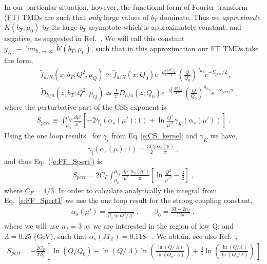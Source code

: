 \documentclass[final,3p,times,onecolumn,sort&compress,hidelinks]{elsarticle}
\newcommand\3[1]{\boldsymbol{#1}}
\begin{document}
In our particular situation, however, the functional form of Fourier transform (FT) TMDs    are such that {\em only} large values of $b_T$  dominate.  
Thus we {\em approximate} $K(b_T,\mu_0)$ by its large $b_T$ asymptote which is approximately  constant, and  negative,
  as suggested in Ref.~\cite{Collins:2014jpa}.
  We will call this constant $g_{K_{0}}\equiv \lim_{b_T\to \infty} \tilde K(b_T,\mu_0)$, such that in this approximation our FT TMDs take the form,
\begin{eqnarray}
&&\tilde f_{a/N} (x,b_T; Q^2, \mu_Q)\simeq \tilde f_{a/N} (x; Q_0) e^{-b_T^2 \frac{\langle k_\perp^2 \rangle_a}{4}}\,\left( \frac{Q}{Q_0}\right)^{g_{K_0}} e^{-S_{pert}/2}\,,
\nonumber \\[0.3cm]
&&\tilde D_{h/a}(z,b_T; Q^2, \mu_Q)\simeq \frac{1}{z^2} D_{h/a}(z; Q_0) e^{-b_T^2 \frac{\langle p_\perp^2 \rangle_a}{4 z^2}}\,\left( \frac{Q}{Q_0}\right)^{g_{K_0}}e^{-S_{pert}/2}\,,
\label{e:FF_ansatz1}
\end{eqnarray}
where the  perturbative part of the CSS exponent is
\begin{eqnarray}
S_{pert} \equiv \int_{\mu_0}^{\mu_Q} \frac{d \mu'}{\mu'}\left[
-2 \gamma_i(\alpha_s(\mu');1) +\ln\frac{Q^2}{\mu'^2}\gamma_K(\alpha_s(\mu'))
 \right] \; .
 \label{e:FF_Spert}
\end{eqnarray}
 Using the  one loop results~\cite{Aybat:2011zv} for $\gamma_i$ from Eq~\eqref{e:CS_kernel} and $\gamma_K$  we have,
\begin{eqnarray}
  \gamma_i(\alpha_s(\mu);1) = \frac{3 C_F}{2}  \frac{\alpha_s(\mu)}{\pi}  \ ,
  \end{eqnarray}
and thus Eq.~(\ref{e:FF_Spert}) is
\begin{eqnarray}
S_{pert} = 2 C_F \int_{\mu_0}^{\mu_Q} \frac{d \mu'}{\mu'} \frac{\alpha_s(\mu')}{\pi} \left[\ln\frac{Q^2}{\mu'^2} - \frac{3}{2}
 \right] \; ,
 \label{e:FF_Spert1}
\end{eqnarray}
where $C_F = 4/3$. In order to calculate analytically the integral from Eq.~\eqref{e:FF_Spert1} we   use the one loop result for the strong coupling constant, 
\begin{eqnarray}
\alpha_s(\mu') = \frac{1}{\beta_0 \ln Q^2/\Lambda^2} \; , \quad\quad
\beta_0 = \frac{33-2 n_f}{12 \pi}\; ,
 \label{e:as}
\end{eqnarray}
where we will use $n_f=3$ as we are interested in the region of low Q; and $\Lambda = 0.25$ (GeV), such that $\alpha_s(M_Z)= 0.118$ ~\cite{Bethke:2012jm}. We obtain, see also Ref.~\cite{Aidala:2014hva},
\begin{eqnarray}
    S_{pert} = -\frac{2 C_F}{\pi \beta_0}\left[\, \ln\left(Q/Q_0\right)
  - \ln\left(Q/\, \Lambda\right) \ln\left(\frac{\ln\left(Q/\,\Lambda\right)}
  {\ln\left(Q_0/\, \Lambda\right)}\right) +
\frac{3}{4} \ln \left(\frac{\ln\left(Q/\Lambda\right)}{\ln\left(Q_0/\Lambda\right)} \right)\, \right].
 \label{e:FF_Spert_analytical}
\end{eqnarray}
\end{document}

